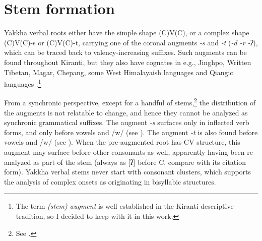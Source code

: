 
\section{Stem formation}\label{stem}

Yakkha verbal roots either have the simple shape (C)V(C), or a complex shape (C)V(C)-s or (C)V(C)-t, carrying one of the coronal augments  \emph{-s} and \emph{-t} (\emph{\ti -d \ti -r \ti -ʔ}), which can be traced back to valency-increasing suffixes. Such augments can be found throughout Kiranti, but they also have cognates in e.g., Jinghpo, Written Tibetan, Magar, Chepang, some West Himalayaish languages and Qiangic languages \citep[457--59]{Matisoff2003Handbook}.\footnote{The term \emph{(stem) augment} is well established in the Kiranti descriptive tradition, so I decided to keep with it in this work.} 

From a synchronic perspective, except for a handful of stems,\footnote{See .} the distribution of the augments is not relatable to  change, and hence they cannot be analyzed as synchronic grammatical suffixes. The augment \emph{-s} surfaces only in inflected verb forms, and only before vowels and /w/ (see \Next[a]). The augment \emph{-t} is also found before vowels and /w/ (see \Next[b]). When the pre-augmented root has CV structure, this augment may surface before other consonants as well, apparently having been re-analyzed as part of the  stem (always as [ʔ] before C, compare \Next[c] with its citation form). Yakkha verbal stems never start with consonant clusters, which supports the analysis of complex onsets as originating in bisyllabic structures. 

